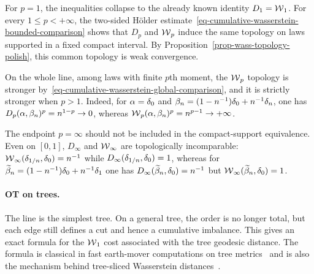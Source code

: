 For $p=1$, the inequalities collapse to the already known identity $D_1=\operatorname{\mathcal{W}}_1$. For every $1\leq p<+\infty$, the two-sided H\"older estimate~\eqref{eq-cumulative-wasserstein-bounded-comparison} shows that $D_p$ and $\operatorname{\mathcal{W}}_p$ induce the same topology on laws supported in a fixed compact interval. By Proposition~\ref{prop-wass-topology-polish}, this common topology is weak convergence.

On the whole line, among laws with finite $p$th moment, the $\operatorname{\mathcal{W}}_p$ topology is stronger by~\eqref{eq-cumulative-wasserstein-global-comparison}, and it is strictly stronger when $p>1$. Indeed, for $\alpha=\delta_0$ and $\beta_n=(1-n^{-1})\delta_0+n^{-1}\delta_n$, one has $D_p(\alpha,\beta_n)^p=n^{1-p}\to0$, whereas $\operatorname{\mathcal{W}}_p(\alpha,\beta_n)^p=n^{p-1}\to+\infty$.

The endpoint $p=\infty$ should not be included in the compact-support equivalence. Even on $[0,1]$, $D_\infty$ and $\operatorname{\mathcal{W}}_\infty$ are topologically incomparable: $\operatorname{\mathcal{W}}_\infty(\delta_{1/n},\delta_0)=n^{-1}$ while $D_\infty(\delta_{1/n},\delta_0)=1$, whereas for $\widetilde{\beta}_n=(1-n^{-1})\delta_0+n^{-1}\delta_1$ one has $D_\infty(\widetilde{\beta}_n,\delta_0)=n^{-1}$ but $\operatorname{\mathcal{W}}_\infty(\widetilde{\beta}_n,\delta_0)=1$.

\paragraph{OT on trees.}

The line is the simplest tree. On a general tree, the order is no longer total, but each edge still defines a cut and hence a cumulative imbalance. This gives an exact formula for the $\operatorname{\mathcal{W}}_1$ cost associated with the tree geodesic distance. The formula is classical in fast earth-mover computations on tree metrics~\cite{TreeEMD2007} and is also the mechanism behind tree-sliced Wasserstein distances~\cite{LeYamadaFukumizuCuturi2019TreeSliced}.

